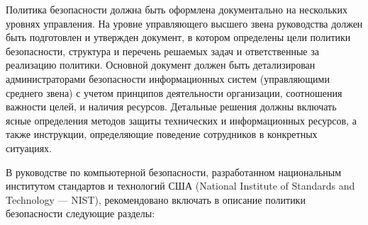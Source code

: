 Политика безопасности должна быть оформлена документально на нескольких уровнях управления. На уровне управляющего
высшего звена руководства должен быть подготовлен и утвержден документ, в котором определены цели политики
безопасности, структура и перечень решаемых задач и ответственные за реализацию политики. Основной документ
должен быть детализирован администраторами безопасности информационных систем (управляющими среднего звена)
с учетом принципов деятельности организации, соотношения важности целей, и наличия ресурсов. Детальные решения
должны включать ясные определения методов защиты технических и информационных ресурсов, а также инструкции,
определяющие поведение сотрудников в конкретных ситуациях.

В руководстве по компьютерной безопасности, разработанном национальным институтом стандартов и технологий
США (National Institute of Standards and Technology — NIST), рекомендовано включать в описание
политики безопасности следующие разделы:
